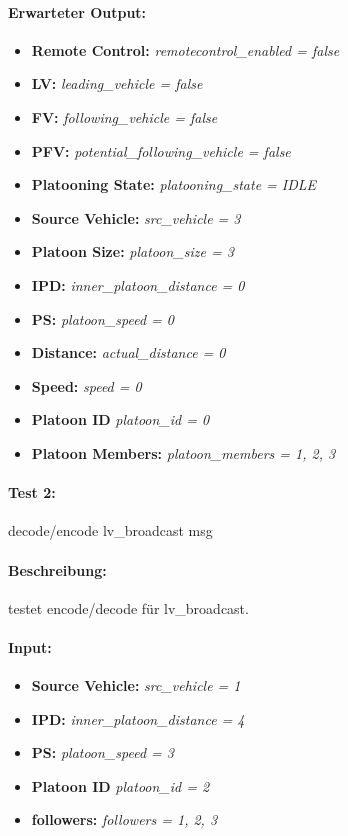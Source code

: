 \documentclass[a4paper, 12pt, titlepage]{scrartcl}
\begin{document}
{			\paragraph{Erwarteter Output:}
			\begin{itemize} \itemsep-0.5em
				\item \textbf{Remote Control:} \emph{remotecontrol\_enabled = false}
				\item \textbf{LV:} \emph{leading\_vehicle = false}
				\item \textbf{FV:} \emph{following\_vehicle = false}
				\item \textbf{PFV:} \emph{potential\_following\_vehicle = false}
				\item \textbf{Platooning State:} \emph{platooning\_state = IDLE}
				\item \textbf{Source Vehicle:} \emph{src\_vehicle = 3}
				\item \textbf{Platoon Size:} \emph{platoon\_size = 3}
				\item \textbf{IPD:} \emph{inner\_platoon\_distance = 0}
				\item \textbf{PS:} \emph{platoon\_speed = 0}
				\item \textbf{Distance:} \emph{actual\_distance = 0}
				\item \textbf{Speed:} \emph{speed = 0}
				\item \textbf{Platoon ID} \emph{platoon\_id = 0}
				\item \textbf{Platoon Members:} \emph{platoon\_members = {1, 2, 3}}
			\end{itemize}
			
			\paragraph{Test 2:}{decode/encode lv\_broadcast msg}
			\paragraph{Beschreibung:} testet encode/decode für lv\_broadcast.
			\paragraph{Input:}
			\begin{itemize} \itemsep-0.5em
				\item \textbf{Source Vehicle:} \emph{src\_vehicle = 1}
				\item \textbf{IPD:} \emph{inner\_platoon\_distance = 4}
				\item \textbf{PS:} \emph{platoon\_speed = 3}
				\item \textbf{Platoon ID} \emph{platoon\_id = 2}
				\item \textbf{followers:} \emph{followers = {1, 2, 3}}
			\end{itemize}
}
\end{document}
